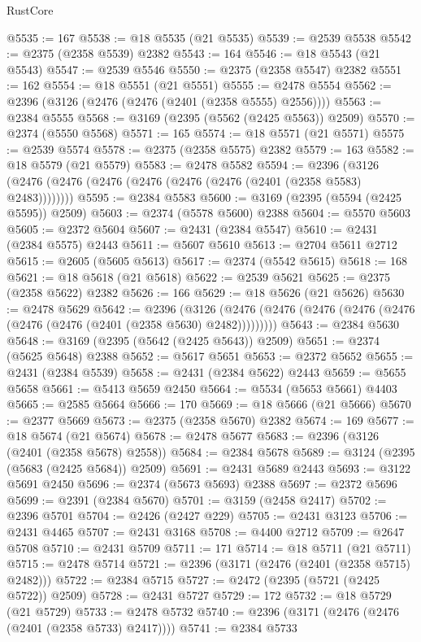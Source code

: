 \begin{lexlean}{RustCore}
\begin{coremodule}
@5535 := 167
@5538 := @18 @5535 (@21 @5535)
@5539 := @2539 @5538
@5542 := @2375 (@2358 @5539) @2382
@5543 := 164
@5546 := @18 @5543 (@21 @5543)
@5547 := @2539 @5546
@5550 := @2375 (@2358 @5547) @2382
@5551 := 162
@5554 := @18 @5551 (@21 @5551)
@5555 := @2478 @5554
@5562 := @2396 (@3126 (@2476 (@2476 (@2401 (@2358 @5555) @2556))))
@5563 := @2384 @5555
@5568 := @3169 (@2395 (@5562 (@2425 @5563)) @2509)
@5570 := @2374 (@5550 @5568)
@5571 := 165
@5574 := @18 @5571 (@21 @5571)
@5575 := @2539 @5574
@5578 := @2375 (@2358 @5575) @2382
@5579 := 163
@5582 := @18 @5579 (@21 @5579)
@5583 := @2478 @5582
@5594 := @2396 (@3126 (@2476 (@2476 (@2476 (@2476 (@2476 (@2476 (@2401 (@2358 @5583) @2483))))))))
@5595 := @2384 @5583
@5600 := @3169 (@2395 (@5594 (@2425 @5595)) @2509)
@5603 := @2374 (@5578 @5600) @2388
@5604 := @5570 @5603
@5605 := @2372 @5604
@5607 := @2431 (@2384 @5547)
@5610 := @2431 (@2384 @5575) @2443
@5611 := @5607 @5610
@5613 := @2704 @5611 @2712
@5615 := @2605 (@5605 @5613)
@5617 := @2374 (@5542 @5615)
@5618 := 168
@5621 := @18 @5618 (@21 @5618)
@5622 := @2539 @5621
@5625 := @2375 (@2358 @5622) @2382
@5626 := 166
@5629 := @18 @5626 (@21 @5626)
@5630 := @2478 @5629
@5642 := @2396
    (@3126 (@2476 (@2476 (@2476 (@2476 (@2476 (@2476 (@2476 (@2401 (@2358 @5630) @2482)))))))))
@5643 := @2384 @5630
@5648 := @3169 (@2395 (@5642 (@2425 @5643)) @2509)
@5651 := @2374 (@5625 @5648) @2388
@5652 := @5617 @5651
@5653 := @2372 @5652
@5655 := @2431 (@2384 @5539)
@5658 := @2431 (@2384 @5622) @2443
@5659 := @5655 @5658
@5661 := @5413 @5659 @2450
@5664 := @5534 (@5653 @5661) @4403
@5665 := @2585 @5664
@5666 := 170
@5669 := @18 @5666 (@21 @5666)
@5670 := @2377 @5669
@5673 := @2375 (@2358 @5670) @2382
@5674 := 169
@5677 := @18 @5674 (@21 @5674)
@5678 := @2478 @5677
@5683 := @2396 (@3126 (@2401 (@2358 @5678) @2558))
@5684 := @2384 @5678
@5689 := @3124 (@2395 (@5683 (@2425 @5684)) @2509)
@5691 := @2431 @5689 @2443
@5693 := @3122 @5691 @2450
@5696 := @2374 (@5673 @5693) @2388
@5697 := @2372 @5696
@5699 := @2391 (@2384 @5670)
@5701 := @3159 (@2458 @2417)
@5702 := @2396 @5701
@5704 := @2426 (@2427 @229)
@5705 := @2431 @3123
@5706 := @2431 @4465
@5707 := @2431 @3168
@5708 := @4400 @2712
@5709 := @2647 @5708
@5710 := @2431 @5709
@5711 := 171
@5714 := @18 @5711 (@21 @5711)
@5715 := @2478 @5714
@5721 := @2396 (@3171 (@2476 (@2401 (@2358 @5715) @2482)))
@5722 := @2384 @5715
@5727 := @2472 (@2395 (@5721 (@2425 @5722)) @2509)
@5728 := @2431 @5727
@5729 := 172
@5732 := @18 @5729 (@21 @5729)
@5733 := @2478 @5732
@5740 := @2396 (@3171 (@2476 (@2476 (@2401 (@2358 @5733) @2417))))
@5741 := @2384 @5733

\end{coremodule}
\end{lexlean}

